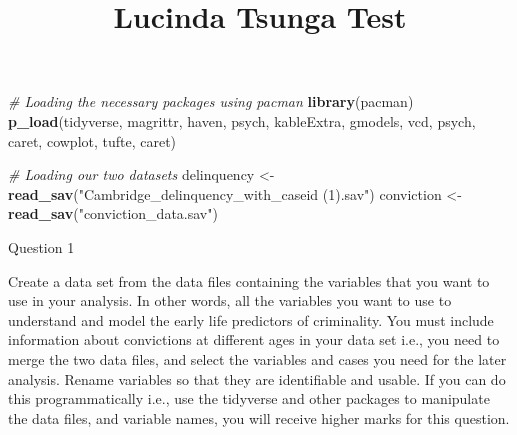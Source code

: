 \documentclass[]{tufte-handout}
\title{Lucinda Tsunga Test}
\date{}
\newenvironment{Shaded}{}{}
\newcommand{\KeywordTok}[1]{\textcolor[rgb]{0.00,0.44,0.13}{\textbf{#1}}}
\newcommand{\StringTok}[1]{\textcolor[rgb]{0.25,0.44,0.63}{#1}}
\newcommand{\CommentTok}[1]{\textcolor[rgb]{0.38,0.63,0.69}{\textit{#1}}}
\newcommand{\NormalTok}[1]{#1}
\begin{document}
\maketitle




\begin{Shaded}
\begin{Highlighting}[]
\CommentTok{# Loading the necessary packages using pacman}
\KeywordTok{library}\NormalTok{(pacman)}
\KeywordTok{p_load}\NormalTok{(tidyverse, magrittr, haven, psych, kableExtra, }
\NormalTok{    gmodels, vcd, psych, caret, cowplot, tufte, }
\NormalTok{    caret)}
\end{Highlighting}
\end{Shaded}

\begin{Shaded}
\begin{Highlighting}[]
\CommentTok{# Loading our two datasets}
\NormalTok{delinquency <-}\StringTok{ }\KeywordTok{read_sav}\NormalTok{(}\StringTok{"Cambridge_delinquency_with_caseid (1).sav"}\NormalTok{)}
\NormalTok{conviction <-}\StringTok{ }\KeywordTok{read_sav}\NormalTok{(}\StringTok{"conviction_data.sav"}\NormalTok{)}
\end{Highlighting}
\end{Shaded}

Question 1

Create a data set from the data files containing the variables that you
want to use in your analysis. In other words, all the variables you want
to use to understand and model the early life predictors of criminality.
You must include information about convictions at different ages in your
data set i.e., you need to merge the two data files, and select the
variables and cases you need for the later analysis. Rename variables so
that they are identifiable and usable. If you can do this
programmatically i.e., use the tidyverse and other packages to
manipulate the data files, and variable names, you will receive higher
marks for this question.
\end{document}
